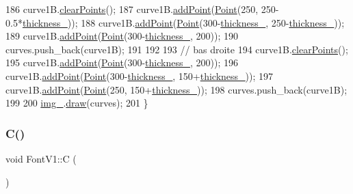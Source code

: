 \begin{DoxyCode}
186     curve1B.\mbox{\hyperlink{class_bezier_curve_a0ba8ce66d5af5971ae6a1b506029728e}{clearPoints}}();
187     curve1B.\mbox{\hyperlink{class_bezier_curve_a38d16c18b36ae45619b05e26e226cf34}{addPoint}}(\mbox{\hyperlink{class_point}{Point}}(250, 250-0.5*\mbox{\hyperlink{class_font_v1_aed8040e76be9a52833627b92f0fb4e5f}{thickness\_}}));
188     curve1B.\mbox{\hyperlink{class_bezier_curve_a38d16c18b36ae45619b05e26e226cf34}{addPoint}}(\mbox{\hyperlink{class_point}{Point}}(300-\mbox{\hyperlink{class_font_v1_aed8040e76be9a52833627b92f0fb4e5f}{thickness\_}}, 250-\mbox{\hyperlink{class_font_v1_aed8040e76be9a52833627b92f0fb4e5f}{thickness\_}}));
189     curve1B.\mbox{\hyperlink{class_bezier_curve_a38d16c18b36ae45619b05e26e226cf34}{addPoint}}(\mbox{\hyperlink{class_point}{Point}}(300-\mbox{\hyperlink{class_font_v1_aed8040e76be9a52833627b92f0fb4e5f}{thickness\_}}, 200));
190     curves.push\_back(curve1B);
191 
192 
193     \textcolor{comment}{// bas droite}
194     curve1B.\mbox{\hyperlink{class_bezier_curve_a0ba8ce66d5af5971ae6a1b506029728e}{clearPoints}}();
195     curve1B.\mbox{\hyperlink{class_bezier_curve_a38d16c18b36ae45619b05e26e226cf34}{addPoint}}(\mbox{\hyperlink{class_point}{Point}}(300-\mbox{\hyperlink{class_font_v1_aed8040e76be9a52833627b92f0fb4e5f}{thickness\_}}, 200));
196     curve1B.\mbox{\hyperlink{class_bezier_curve_a38d16c18b36ae45619b05e26e226cf34}{addPoint}}(\mbox{\hyperlink{class_point}{Point}}(300-\mbox{\hyperlink{class_font_v1_aed8040e76be9a52833627b92f0fb4e5f}{thickness\_}}, 150+\mbox{\hyperlink{class_font_v1_aed8040e76be9a52833627b92f0fb4e5f}{thickness\_}}));
197     curve1B.\mbox{\hyperlink{class_bezier_curve_a38d16c18b36ae45619b05e26e226cf34}{addPoint}}(\mbox{\hyperlink{class_point}{Point}}(250, 150+\mbox{\hyperlink{class_font_v1_aed8040e76be9a52833627b92f0fb4e5f}{thickness\_}}));
198     curves.push\_back(curve1B);
199 
200     \mbox{\hyperlink{class_font_v1_a00569e3e3c4b70f437b63f396f735fb0}{img\_}}.\mbox{\hyperlink{class_image_a8d162f3cab956131d58708c09aa560b0}{draw}}(curves);
201 \}
\end{DoxyCode}
\mbox{\label{class_font_v1_a80602716ae6907fa518fbb50eeda2515}} 
\subsubsection{\texorpdfstring{C()}{C()}}
{\footnotesize\ttfamily void Font\+V1\+::C (\begin{DoxyParamCaption}{ }\end{DoxyParamCaption})}



